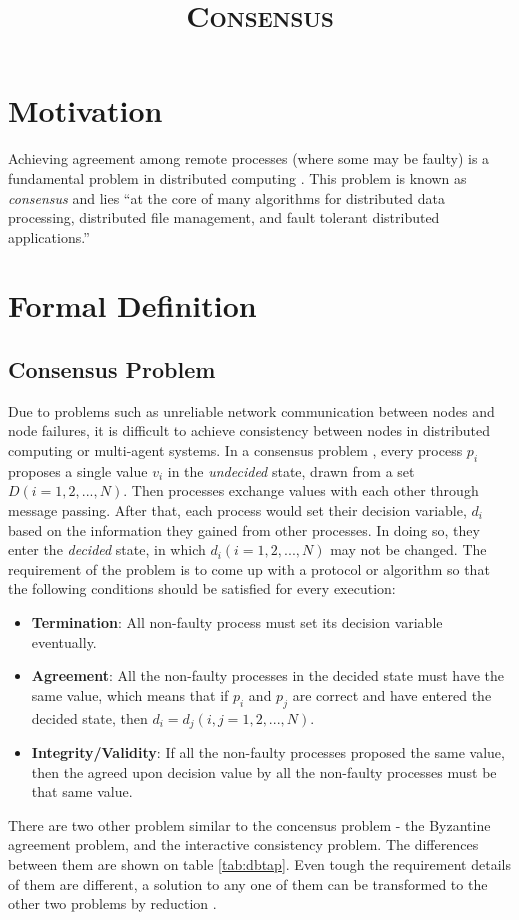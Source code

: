 \documentclass[12pt, a4paper]{article}
\title{\textsc{Consensus}}
\author{}
\date{}
\begin{document}
\maketitle


\section{Motivation}

Achieving agreement among remote processes (where some may be faulty) is a
fundamental problem in distributed computing \cite{fischer1985impossibility}.
This problem is known as \textit{consensus} and lies ``at the core of many
algorithms for distributed data processing, distributed file management, and
fault tolerant distributed applications.'' \cite{fischer1985impossibility}

\section{Formal Definition}

\subsection{Consensus Problem}

Due to problems such as unreliable network communication between nodes and node
failures, it is difficult to achieve consistency between nodes in distributed
computing or multi-agent systems. In a consensus problem
\cite{coulouris2005distributed}, every process $p_{i}$ proposes a single value
$v_{i}$ in the \textit{undecided} state, drawn from a set $D(i = 1,2,...,N)$.
Then processes exchange values with each other through message passing. After
that, each process would set their decision variable, $d_{i}$ based on the
information they gained from other processes. In doing so, they enter the
\textit{decided} state, in which $d_{i} (i = 1, 2, ..., N)$ may not be changed.
The requirement of the problem is to come up with a protocol or algorithm so
that the following conditions should be satisfied for every execution:
\begin{itemize} \item \textbf{Termination}: All non-faulty process must set its
decision variable eventually. \item \textbf{Agreement}: All the non-faulty
processes in the decided state must have the same value, which means that if
$p_{i}$ and $p_{j}$ are correct and have entered the decided state, then $d_{i} =
d_{j}(i, j = 1, 2, ..., N)$. \item \textbf{Integrity/Validity}: If all the
non-faulty processes proposed the same value, then the agreed upon decision
value by all the non-faulty processes must be that same value. \end{itemize}
There are two other problem similar to the concensus problem - the Byzantine
agreement problem, and the interactive consistency problem. The differences
between them are shown on table \ref{tab:dbtap}. Even tough the requirement
details of them are different, a solution to any one of them can be transformed
to the other two problems by reduction \cite{fischer1983consensus}.
\end{document}
